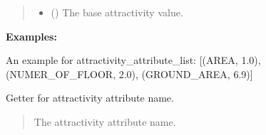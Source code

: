 \documentclass[letterpaper,10pt,english]{sphinxmanual}
\begin{document}
\begin{fulllineitems}
\begin{fulllineitems}
\begin{quote}
\begin{description}
\begin{itemize}
\item {} 
\sphinxAtStartPar
{} () \textendash{} The base attractivity value.

\end{itemize}

\end{description}\end{quote}
\textbf{Examples:}
\sphinxAtStartPar

\sphinxAtStartPar
An example for attractivity\_attribute\_list: {[}(AREA, 1.0), (NUMER\_OF\_FLOOR, 2.0), (GROUND\_AREA, 6.9){]}

\end{fulllineitems}


\begin{fulllineitems}
\label{\detokenize{apidoc/src.osm_configurator.model.project.configuration:src.osm_configurator.model.project.configuration.attractivity_attribute.AttractivityAttribute.get_attractivity_attribute_name}}
\pysigstartsignatures
{}
\pysigstopsignatures
\sphinxAtStartPar
Getter for attractivity attribute name.
\begin{quote}\begin{description}
\sphinxAtStartPar
The attractivity attribute name.

\sphinxAtStartPar
{}

\end{description}\end{quote}

\end{fulllineitems}



\end{fulllineitems}
\end{document}
